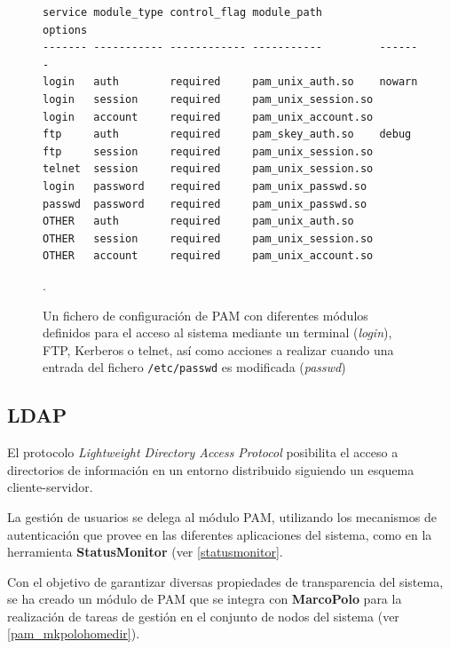 \begin{figure}[H]
\centering
\begin{lstlisting}
service module_type control_flag module_path         options
------- ----------- ------------ -----------         -------
login   auth        required     pam_unix_auth.so    nowarn
login   session     required     pam_unix_session.so
login   account     required     pam_unix_account.so
ftp     auth        required     pam_skey_auth.so    debug
ftp     session     required     pam_unix_session.so
telnet  session     required     pam_unix_session.so
login   password    required     pam_unix_passwd.so
passwd  password    required     pam_unix_passwd.so
OTHER   auth        required     pam_unix_auth.so
OTHER   session     required     pam_unix_session.so
OTHER   account     required     pam_unix_account.so
\end{lstlisting}

\caption[Fichero de configuración de PAM]{Un fichero de configuración de PAM con diferentes módulos definidos para el acceso al sistema mediante un terminal (\textit{login}), FTP, Kerberos o telnet, así como acciones a realizar cuando una entrada del fichero \texttt{/etc/passwd} es modificada (\textit{passwd})}.
\end{figure}

\subsection{LDAP}
\label{teoria:ldap}

El protocolo \textit{Lightweight Directory Access Protocol} posibilita el acceso a directorios de información en un entorno distribuido siguiendo un esquema cliente-servidor.



La gestión de usuarios se delega al módulo PAM, utilizando los mecanismos de autenticación que provee en las diferentes aplicaciones del sistema, como en la herramienta \textbf{StatusMonitor} (ver \ref{statusmonitor}.

Con el objetivo de garantizar diversas propiedades de transparencia del sistema, se ha creado un módulo de PAM que se integra con \textbf{MarcoPolo} para la realización de tareas de gestión en el conjunto de nodos del sistema (ver \ref{pam_mkpolohomedir}).

